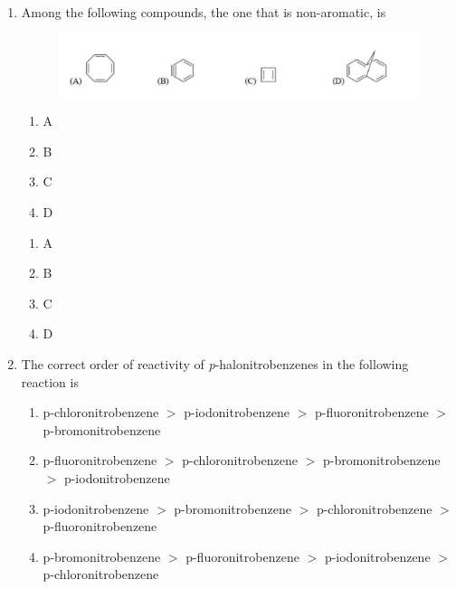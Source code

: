 \documentclass[journal,12pt,onecolumn]{exam}
\theoremstyle{remark}
\newcommand{\correct}{\textcolor{correctgreen}{\checkmark}}
\newcommand{\wrong}{\textcolor{wrongred}{\ding{55}}} %
\begin{document}
\begin{enumerate}
\hfill{}

\begin{multicols}{2}
\begin{enumerate}
    \item \wrong A
    \item \wrong B
    \item \wrong C
    \item \correct D
\end{enumerate}
\end{multicols}


\item
Among the following compounds, the one that is non-aromatic, is

\begin{figure}[H]
    \centering
    \includegraphics[width=1\textwidth]{figs/image2.jpg}
    \caption{}
    \label{fig:figure4}
   
\end{figure}

\begin{enumerate}
    \item A
    \item B
    \item C
    \item D
\end{enumerate}

\hfill{}

\begin{multicols}{2}
\begin{enumerate}
    \item \correct A
    \item \wrong B
    \item \wrong C
    \item \wrong D
\end{enumerate}
\end{multicols}


\item
The correct order of reactivity of \emph{p}-halonitrobenzenes in the following reaction is

\begin{enumerate}
    \item p-chloronitrobenzene $>$ p-iodonitrobenzene $>$ p-fluoronitrobenzene $>$ p-bromonitrobenzene
    \item p-fluoronitrobenzene $>$ p-chloronitrobenzene $>$ p-bromonitrobenzene $>$ p-iodonitrobenzene
    \item p-iodonitrobenzene $>$ p-bromonitrobenzene $>$ p-chloronitrobenzene $>$ p-fluoronitrobenzene
    \item p-bromonitrobenzene $>$ p-fluoronitrobenzene $>$ p-iodonitrobenzene $>$ p-chloronitrobenzene
\end{enumerate}


\end{enumerate}
\end{document}

